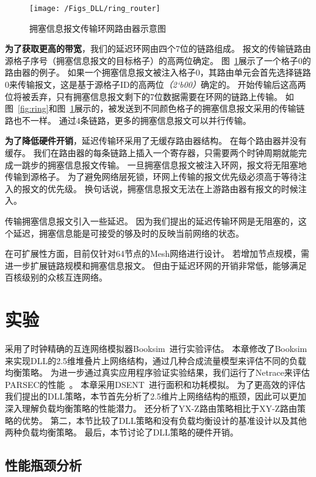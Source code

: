 \begin{figure}[htbp] %
  \centering
  \texttt{[image: /Figs\_DLL/ring\_router]}
  \caption{拥塞信息报文传输环网路由器示意图}
  \label{fig:ring_router}
\end{figure}

\textbf{为了获取更高的带宽}，我们的延迟环网由四个7位的链路组成。
报文的传输链路由源格子序号（拥塞信息报文的目标格子）的高两位确定。
图~\ref{fig:ring_router}展示了一个格子0的路由器的例子。
如果一个拥塞信息报文被注入格子0，其路由单元会首先选择链路0来传输报文，这是基于源格子ID的高两位\emph{（2‘b00）}确定的。
开始传输后这高两位将被丢弃，只有拥塞信息报文剩下的7位数据需要在环网的链路上传输。
如图~\ref{fig:ring}和图~\ref{fig:ring_router}展示的，被发送到不同颜色格子的拥塞信息报文采用的传输链路也不一样。
通过4条链路，更多的拥塞信息报文可以并行传输。

\textbf{为了降低硬件开销}，延迟传输环采用了无缓存路由器结构。
在每个路由器并没有缓存。
我们在路由器的每条链路上插入一个寄存器，只需要两个时钟周期就能完成一跳步的拥塞信息报文传输。
一旦拥塞信息报文被注入环网，报文将无阻塞地传输到源格子。
为了避免网络层死锁，环网上传输的报文优先级必须高于等待注入的报文的优先级。
换句话说，拥塞信息报文无法在上游路由器有报文的时候注入。

传输拥塞信息报文引入一些延迟。
因为我们提出的延迟传输环网是无阻塞的，这个延迟，拥塞信息能是可接受的够及时的反映当前网络的状态。

在可扩展性方面，目前仅针对64节点的Mesh网络进行设计。
若增加节点规模，需进一步扩展链路规模和拥塞信息报文。
但由于延迟环网的开销非常低，能够满足百核级别的众核互连网络。

\section{实验}
\label{sec:dllexperiment}
采用了时钟精确的互连网络模拟器Booksim~进行实验评估。
本章修改了Booksim来实现DLL的2.5维堆叠片上网络结构，通过几种合成流量模型来评估不同的负载均衡策略。
为进一步通过真实应用程序验证实验结果，我们运行了Netrace来评估PARSEC的性能~。
本章采用DSENT~进行面积和功耗模拟。
为了更高效的评估我们提出的DLL策略，本节首先分析了2.5维片上网络结构的瓶颈，因此可以更加深入理解负载均衡策略的性能潜力。
还分析了YX-Z路由策略相比于XY-Z路由策略的优势。
第二，本节比较了DLL策略和没有负载均衡设计的基准设计以及其他两种负载均衡策略。
最后，本节讨论了DLL策略的硬件开销。

\subsection{性能瓶颈分析}


